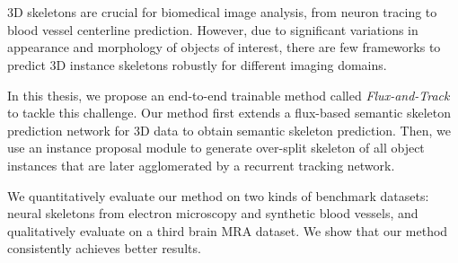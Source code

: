 \chapter{\abstractname}

3D skeletons are crucial for biomedical image analysis, from neuron tracing to blood vessel centerline prediction. However, due to significant variations in appearance and morphology of objects of interest, there are few frameworks to predict 3D instance skeletons robustly for different imaging domains.

In this thesis, we propose an end-to-end trainable method called {\it Flux-and-Track} to tackle this challenge. Our method first extends a flux-based semantic skeleton prediction network for 3D data to obtain semantic skeleton prediction. Then, we use an instance proposal module to generate over-split skeleton of all object instances that are later agglomerated by a recurrent tracking network.

We quantitatively evaluate our method on two kinds of benchmark datasets: neural skeletons from electron microscopy and synthetic blood vessels, and qualitatively evaluate on a third brain MRA dataset. We show that our method consistently achieves better results.






